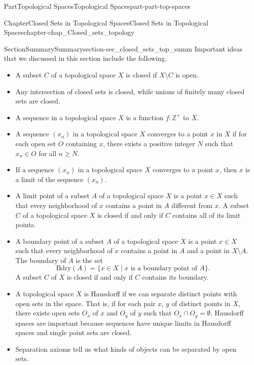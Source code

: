 \documentclass[oneside,10pt,]{book}
\numberwithin{equation}{chapter}
\newcommand{\Z}{\mathbb{Z}}
\newcommand{\Bdry}{\text{Bdry}}
\begin{document}
\begin{partptx}{Part}{Topological Spaces}{}{Topological Spaces}{}{}{part-part-top-spaces}
\begin{chapterptx}{Chapter}{Closed Sets in Topological Spaces}{}{Closed Sets in Topological Spaces}{}{}{chapter-chap_Closed_sets_topology}
%
%
\typeout{************************************************}
\typeout{************************************************}
%
\begin{sectionptx}{Section}{Summary}{}{Summary}{}{}{section-sec_closed_sets_top_summ}
Important ideas that we discussed in this section include the following.%
\begin{itemize}[label=\textbullet]
\item{}A subset \(C\) of a topological space \(X\) is closed if \(X \setminus C\) is open.%
\item{}Any intersection of closed sets is closed, while unions of finitely many closed sets are closed.%
\item{}A sequence in a topological space \(X\) is a function \(f: \Z^+\) to \(X\).%
\item{}A sequence \((x_n)\) in a topological space \(X\) converges to a point \(x\) in \(X\) if for each open set \(O\) containing \(x\), there exists a positive integer \(N\) such that \(x_n \in O\) for all \(n \geq N\).%
\item{}If a sequence \((x_n)\) in a topological space \(X\) converges to a point \(x\), then \(x\) is a limit of the sequence \((x_n)\).%
\item{}A limit point of a subset \(A\) of a topological space \(X\) is a point \(x \in X\) such that every neighborhood of \(x\) contains a point in \(A\) different from \(x\). A subset \(C\) of a topological space \(X\) is closed if and only if \(C\) contains all of its limit points.%
\item{}A boundary point of a subset \(A\) of a topological space \(X\) is a point \(x \in X\) such that every neighborhood of \(x\) contains a point in \(A\) and a point in \(X \setminus A\). The boundary of \(A\) is the set%
\begin{equation*}
\Bdry(A) = \{x \in X \mid x \text{ is a boundary point of }  A\}\text{.}
\end{equation*}
A subset \(C\) of \(X\) is closed if and only if \(C\) contains its boundary.%
\item{}A topological space \(X\) is Hausdorff if we can separate distinct points with open sets in the space. That is, if for each pair \(x\), \(y\) of distinct points in \(X\), there exists open sets \(O_x\) of \(x\) and \(O_y\) of \(y\) such that \(O_x \cap O_y = \emptyset\). Hausdorff spaces are important because sequences have unique limits in Hausdorff spaces and single point sets are closed.%
\item{}Separation axioms tell us what kinds of objects can be separated by open sets.%

\end{itemize}
\end{sectionptx}
\end{chapterptx}
\end{partptx}
\end{document}
